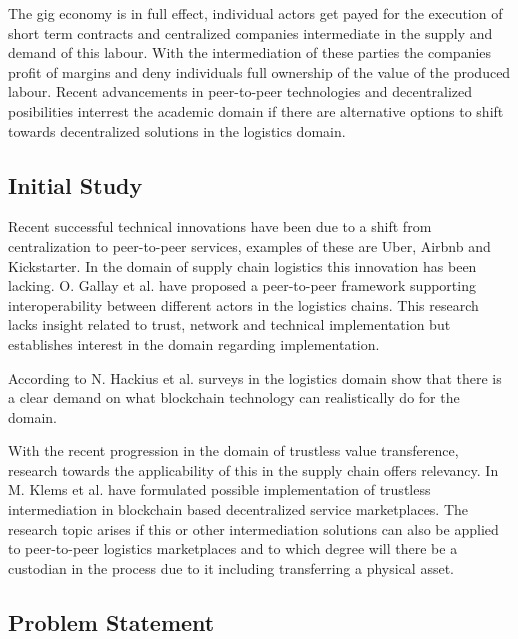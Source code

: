 The gig economy is in full effect, individual actors get payed for the execution of short term contracts and centralized companies intermediate in the supply and demand of this labour. With the intermediation of these parties the companies profit of margins and deny individuals full ownership of the value of the produced labour. Recent advancements in peer-to-peer technologies and decentralized posibilities interrest the academic domain if there are alternative options to shift towards decentralized solutions in the logistics domain.\par

\subsection{Initial Study}

Recent successful technical innovations have been due to a shift from centralization to peer-to-peer services, examples of these are Uber, Airbnb and Kickstarter. In the domain of supply chain logistics this innovation has been lacking. O. Gallay et al. \cite{peer-to-peerDecentralizedLogistics} have proposed a peer-to-peer framework supporting interoperability between different actors in the logistics chains. This research lacks insight related to trust, network and technical implementation but establishes interest in the domain regarding implementation. \par
According to N. Hackius et al. \cite{hackius2017blockchain} surveys in the logistics domain show that there is a clear demand on what blockchain technology can realistically do for the domain. \par
With the recent progression in the domain of trustless value transference, research towards the applicability of this in the supply chain offers relevancy. In \cite{trustlessIntermediationInBCServiceMarket} M. Klems et al. have formulated possible implementation of trustless intermediation in blockchain based decentralized service marketplaces. The research topic arises if this or other intermediation solutions can also be applied to peer-to-peer logistics marketplaces and to which degree will there be a custodian in the process due to it including transferring a physical asset.

\subsection{Problem Statement}

